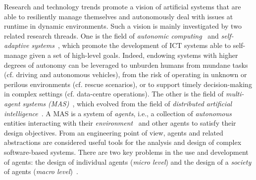 Research and technology trends 
 promote a vision of artificial systems
 that are able to resiliently manage themselves 
 and autonomously deal with issues at runtime
 in dynamic environments.
%
Such a vision is mainly investigated by two related research threads.
%
One is the field of \emph{autonomic computing}~\cite{DBLP:journals/computer/KephartC03} and \emph{self-adaptive systems}~\cite{lemos2010sweng-selfadaptive-2ndresearchroadmap},
 which promote the development of ICT  systems
 able to self-manage given a set of high-level goals.
%
Indeed, endowing systems with higher degrees of autonomy can be leveraged to
 unburden humans from mundane tasks (cf. driving and autonomous vehicles),
 from the risk of operating in unknown or perilous environments
 (cf. rescue scenarios),
 or to support timely decision-making in complex settings
 (cf. data-centre operations).
%
The other is the field of \emph{multi-agent systems (MAS)}~\cite{wooldridge2009mas}, which evolved from the field of \emph{distributed artificial intelligence}~\cite{ferber1999mas-dai}.
%
A MAS is a system of \emph{agents}, i.e., a collection of \emph{autonomous} entities interacting with their \emph{environment}~\cite{DBLP:journals/aamas/WeynsOO07} and other agents to satisfy their design objectives.
%
From an engineering point of view, agents and related abstractions are considered useful tools for the analysis
and design of complex software-based systems.
%
There are two key problems in the use and development of agents: the design of individual agents (\emph{micro level}) and the design of a \emph{society} of agents (\emph{macro level})~\cite{wooldridge2009mas}.

